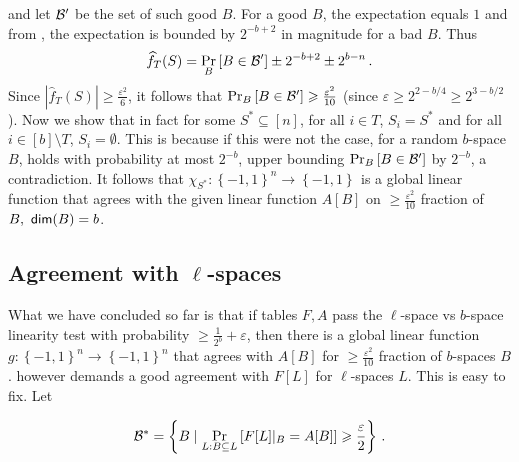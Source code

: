 \documentclass{toc}
\newcommand\set[1]{{\left\{ #1 \right\}}}
\newcommand\Prob[2]{{\Pr_{#1}\left[ {#2} \right]}}
\newcommand\cube[1]{ { \set{-1,1}^{#1} } }
\newcommand\eps{\varepsilon}
\renewcommand\geq{\geqslant}
\begin{document}
and let ${\cal B}'$ be the set of such good $B$.
For a good $B$, the expectation equals $1$ and from ,
the expectation is bounded by
$2^{-b+2}$
%
in magnitude for a bad $B$. Thus
$$  \widehat{f}_T(S)  =  \Prob{B}{B \in {\cal B}'}  \pm 2^{-b+2} \pm 2^{b-n}\,. $$
Since $|  \widehat{f}_T(S)| \geq \frac{\eps^2}{6}$, it follows that $\Prob{B}{B \in {\cal B}'} \geq \frac{\eps^2}{10}$ (since $\eps \geq 2^{2-b/4}\geqslant 2^{3-b/2}$). %
%
Now we show that in fact for some $S^* \subseteq [n]$, for all $i \in T$, $S_i = S^*$ and for all $i \in [b]\setminus T$, $S_i = \emptyset$. This is
because if this were not the case, for a random $b$-space $B$,  holds with probability at most $2^{-b}$, upper
bounding  $\Prob{B}{B \in {\cal B}' }$  by $2^{-b}$, a contradiction. It follows that $\chi_{S^*}: \cube{n}\to \cube{}$ is a global linear function
that agrees with the given linear function $A[B]$ on $\geq \frac{\eps^2}{10}$ fraction of $B, ~{\sf dim}(B)=b$.

%
\subsection{Agreement with \texorpdfstring{$\ell$-spaces}{l-spaces}}
What we have concluded so far is that if tables $F, A$ pass
the $\ell$-space vs $b$-space linearity test with probability $\geq \frac{1}{2^b} + \eps$, then there is a
global linear function $g: \cube{n} \to \cube{n}$ that agrees with $A[B]$ for $\geq  \frac{\eps^2}{10}$ fraction of $b$-spaces $B$.  however demands a good agreement with $F[L]$ for $\ell$-spaces $L$. This is easy to fix. Let

 $$ {\cal B}^* =
 \left\{ B \mid \Prob{L: B \subseteq L}{F[L]|_B = A[B]}  \geq \frac{\eps}{2} \right\}\,. $$%
\end{document}

